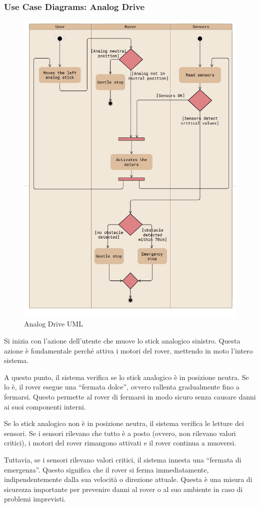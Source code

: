 \documentclass{article}
\begin{document}
      \subsubsection{Use Case Diagrams: Analog Drive}
        \begin{figure}[h]
          \includegraphics[width=0.7\linewidth]{../Use_Case_Diagram/Drive_Analog.jpg}
          \centering
          \caption{Analog Drive UML}
        \end{figure}

        Si inizia con l’azione dell’utente che muove lo stick analogico sinistro. Questa azione è fondamentale perché attiva i motori del rover, mettendo in moto l’intero sistema.

        A questo punto, il sistema verifica se lo stick analogico è in posizione neutra. Se lo è, il rover esegue una “fermata dolce”, ovvero rallenta gradualmente fino a fermarsi. Questo permette al rover di fermarsi in modo sicuro senza causare danni ai suoi componenti interni.
        
        Se lo stick analogico non è in posizione neutra, il sistema verifica le letture dei sensori. Se i sensori rilevano che tutto è a posto (ovvero, non rilevano valori critici), i motori del rover rimangono attivati e il rover continua a muoversi.
        
        Tuttavia, se i sensori rilevano valori critici, il sistema innesta una “fermata di emergenza”. Questo significa che il rover si ferma immediatamente, indipendentemente dalla sua velocità o direzione attuale. Questa è una misura di sicurezza importante per prevenire danni al rover o al suo ambiente in caso di problemi imprevisti.
        
\end{document}

